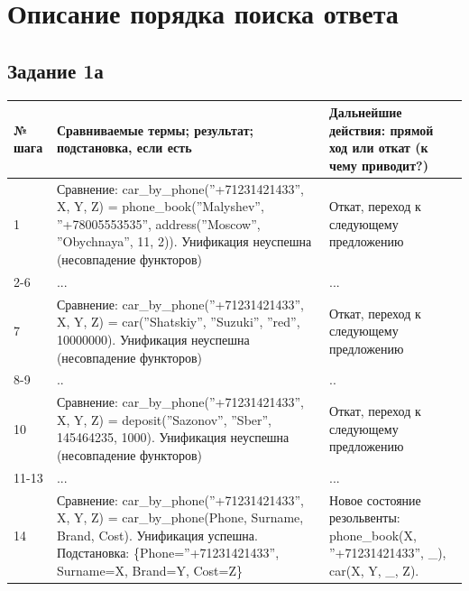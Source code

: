 \documentclass[12pt]{report}
\begin{document}
\section*{Описание порядка поиска ответа}

\subsection*{Задание 1а}

\begin{table}[H]
	\begin{center}
		\begin{tabular}{|p{1 cm}|p{12 cm}|p{6 cm}|}
			\hline
			№ шага & Сравниваемые термы; результат; подстановка, если есть & Дальнейшие действия: прямой ход или откат (к чему приводит?) \\
			\hline 
			1 & Сравнение: \newline car\_by\_phone(''+71231421433'', X, Y, Z) = \newline phone\_book(''Malyshev'', ''+78005553535'', address(''Moscow'', ''Obychnaya'', 11, 2)). \newline Унификация неуспешна (несовпадение функторов) & Откат, переход к следующему предложению \\
			\hline
			2-6 & ... & ... \\
			\hline
			7 & Сравнение: \newline car\_by\_phone(''+71231421433'', X, Y, Z) = \newline car(''Shatskiy'', ''Suzuki'', ''red'', 10000000). \newline Унификация неуспешна (несовпадение функторов) & Откат, переход к следующему предложению \\
			\hline
			8-9 & .. & .. \\
			\hline
			10 & Сравнение: \newline car\_by\_phone(''+71231421433'', X, Y, Z) = \newline deposit(''Sazonov'', ''Sber'', 145464235, 1000). \newline Унификация неуспешна (несовпадение функторов) & Откат, переход к следующему предложению \\
			\hline
			11-13 & ... & ... \\
			\hline
			14 & Сравнение: \newline car\_by\_phone(''+71231421433'', X, Y, Z) = \newline car\_by\_phone(Phone, Surname, Brand, Cost). \newline Унификация успешна. \newline Подстановка: \{Phone=''+71231421433'', Surname=X, Brand=Y, Cost=Z\} & Новое состояние резольвенты: \newline phone\_book(X, ''+71231421433'', \_), car(X, Y, \_, Z). \\

\end{tabular}
\end{center}
\end{table}
\end{document}
